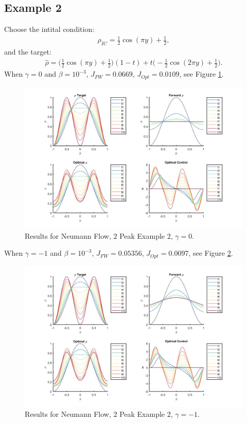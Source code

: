 \documentclass[11pt, a4paper]{article}
\theoremstyle{definition}
\begin{document}
\subsection{Example 2}
Choose the intital condition:
\begin{align*}
\rho_{IC} = \frac{1}{2}\cos(\pi y) + \frac{1}{2},
\end{align*}
and the target:
\begin{align*}
\hat \rho = \bigg(\frac{1}{2}\cos(\pi y) + \frac{1}{2}\bigg)(1-t) + t\bigg(-\frac{1}{2}\cos(2 \pi y) + \frac{1}{2}\bigg).
\end{align*}
When $\gamma = 0$ and $\beta = 10^{-3}$, $J_{FW} = 0.0669$, $J_{Opt} = 0.0109$, see Figure \ref{Ex12Peak2}.
\begin{figure}[h]
	\includegraphics[scale=0.3]{Res2Peak2.jpg}
	\caption{Results for Neumann Flow, $2$ Peak Example $2$, $\gamma = 0$.}
	\label{Ex12Peak2}
\end{figure}
When $\gamma = -1$ and $\beta = 10^{-3}$, $J_{FW} = 0.05356$, $J_{Opt} = 0.0097$, see Figure \ref{Ex12Peak2a}.
\begin{figure}[h]
	\includegraphics[scale=0.3]{Res2Peak2a.jpg}
	\caption{Results for Neumann Flow, $2$ Peak Example $2$, $\gamma = -1$.}
	\label{Ex12Peak2a}
\end{figure}
\end{document}
